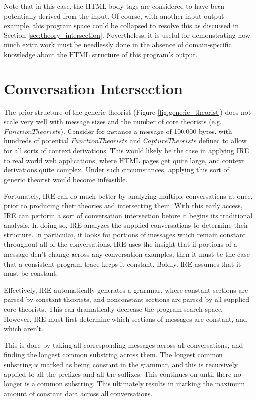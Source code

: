 Note that in this case, the HTML body tags are considered to have been potentially derived from the input.
Of course, with another input-output example, this program space could be collapsed to resolve this as discussed in Section \ref{sec:theory_intersection}.
Nevertheless, it is useful for demonstrating how much extra work must be needlessly done in the absence of domain-specific knowledge about the HTML structure of this program's output.

\section{Conversation Intersection}

The prior structure of the generic theorist (Figure \ref{fig:generic_theorist}) does not scale very well with message sizes and the number of core theorists (e.g. $FunctionTheorist$s).
Consider for instance a message of 100,000 bytes, with hundreds of potential $FunctionTheorist$s and $CaptureTheorist$s defined to allow for all sorts of context derivations.
This would likely be the case in applying IRE to real world web applications, where HTML pages get quite large, and context derivations quite complex.
Under such circumstances, applying this sort of generic theorist would become infeasible.

Fortunately, IRE can do much better by analyzing multiple conversations at once, prior to producing their theories and intersecting them.
With this early access, IRE can perform a sort of conversation intersection before it begins its traditional analysis.
In doing so, IRE analyzes the supplied conversations to determine their structure.
In particular, it looks for portions of messages which remain constant throughout all of the conversations.
IRE uses the insight that if portions of a message don't change across any conversation examples, then it must be the case that a consistent program trace keeps it constant.
Boldly, IRE assumes that it must be constant.

Effectively, IRE automatically generates a grammar, where constant sections are parsed by constant theorists, and nonconstant sections are parsed by all supplied core theorists.
This can dramatically decrease the program search space.
However, IRE must first determine which sections of messages are constant, and which aren't.

This is done by taking all corresponding messages across all conversations, and finding the longest common substring across them.
The longest common substring is marked as being constant in the grammar, and this is recursively applied to all the prefixes and all the suffixes.
This continues on until there no longer is a common substring.
This ultimately results in marking the maximum amount of constant data across all conversations.

